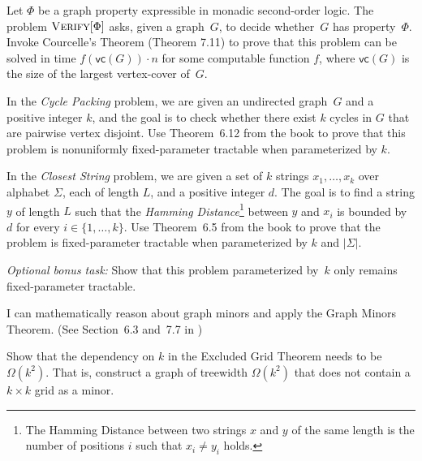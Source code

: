 \documentclass[english]{uebung_cs}
\begin{document}
\begin{exercise}
  Let $\Phi$ be a graph property expressible in monadic second-order logic. The problem $\textsc{Verify}[\Phi]$ asks, given a graph~$G$, to decide whether~$G$ has property~$\Phi$.
  Invoke Courcelle's Theorem (Theorem 7.11) to prove that this problem can be solved in time $f(\mathsf{vc}(G))\cdot n$ for some computable function $f$, where $\mathsf{vc}(G)$ is the size of the largest vertex-cover of~$G$.
\end{exercise}

\begin{exercise}
  In the \emph{Cycle Packing} problem, we are given an undirected graph~$G$ and a positive integer $k$, and the goal is to check whether there exist $k$ cycles in $G$ that are pairwise vertex disjoint. Use Theorem~6.12 from the book to prove that this problem is nonuniformly fixed-parameter tractable when parameterized by $k$.
\end{exercise}

\begin{exercise}
  In the \emph{Closest String} problem, we are given a set of $k$ strings $x_1,\dots,x_k$ over alphabet $\Sigma$, each of length $L$, and a positive integer $d$. The goal is to find a string $y$ of length $L$ such that the \emph{Hamming Distance}\footnote{The Hamming Distance between two strings $x$ and $y$ of the same length is the number of positions $i$ such that $x_i \neq y_i$ holds.} between $y$ and $x_i$ is bounded by $d$ for every $i\in \{1,\dots,k\}$. Use Theorem~6.5 from the book to prove that the problem is fixed-parameter tractable when parameterized by $k$ and $|\Sigma|$.

  \noindent\emph{Optional bonus task:} Show that this problem parameterized by~$k$ only remains fixed-parameter tractable.
\end{exercise}

\newpage
\begin{skill}
  I can mathematically reason about graph minors and apply the Graph Minors Theorem. \normalfont (See Section~6.3 and~7.7 in \cygan{})
\end{skill}

\begin{exercise}
  Show that the dependency on $k$ in the Excluded Grid Theorem needs to be $\Omega(k^2)$. That is, construct a graph of treewidth $\Omega(k^2)$ that does not contain a $k \times k$ grid as a minor.
\end{exercise}
\end{document}
